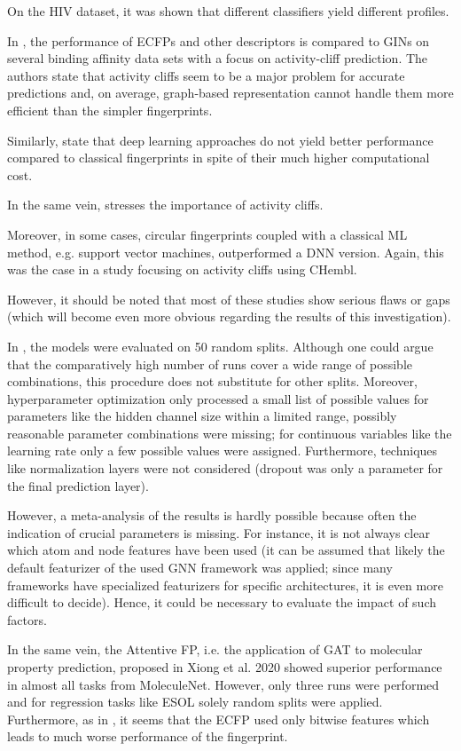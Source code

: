 On the HIV dataset, it was shown that different classifiers yield different profiles.

In \cite{Dablander.2023}, the performance of ECFPs and other descriptors is compared to GINs on several binding affinity data sets with a focus on activity-cliff prediction. The authors state that activity cliffs seem to be a major problem for accurate predictions and, on average, graph-based representation cannot handle them more efficient than the simpler fingerprints. 

Similarly, \cite{Stepisnik.2021} state that deep learning approaches do not yield better performance compared to classical fingerprints in spite of their much higher computational cost.

In the same vein, \cite{Deng.2023} stresses the importance of activity cliffs.

Moreover, in some cases, circular fingerprints coupled with a classical ML method, e.g. support vector machines, outperformed a DNN version. Again, this was the case in a study focusing on activity cliffs using CHembl.

However, it should be noted that most of these studies show serious flaws or gaps (which will become even more obvious regarding the results of this investigation).

In \cite{Jiang.2021}, the models were evaluated on 50 random splits. Although one could argue that the comparatively high number of runs cover a wide range of possible combinations, this procedure does not substitute for other splits.
Moreover, hyperparameter optimization only processed a small list of possible values for parameters like the hidden channel size within a limited range, possibly reasonable parameter combinations were missing; for continuous variables like the learning rate only a few possible values were assigned. Furthermore, techniques like normalization layers were not considered (dropout was only a parameter for the final prediction layer). 


However, a meta-analysis of the results is hardly possible because often the indication of crucial parameters is missing. For instance, it is not always clear which atom and node features have been used (it can be assumed that likely the default featurizer of the used GNN framework was applied; since many frameworks have specialized featurizers for specific architectures, it is even more difficult to decide). Hence, it could be necessary to evaluate the impact of such factors.

In the same vein, the Attentive FP, i.e. the application of GAT to molecular property prediction, proposed in Xiong et al. 2020 showed superior performance in almost all tasks from MoleculeNet. However, only three runs were performed and for regression tasks like ESOL solely random splits were applied. Furthermore, as in \cite{Duvenaud.30.09.2015}, it seems that the ECFP used only bitwise features which leads to much worse performance of the fingerprint.


